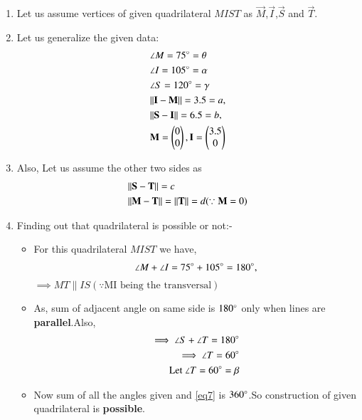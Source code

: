 \documentclass[journal,12pt,twocolumn]{IEEEtran}
\begin{document}
\begin{enumerate}
\item Let us assume vertices of given quadrilateral $MIST$ as $\vec{M}$,$\vec{I}$,$\vec{S}$ and $\vec{T}$.

\item Let us generalize the given data:
    \begin{align}
    &\angle M= 75\degree=\theta \label{eq1}
    \\
    &\angle I= 105\degree=\alpha
    \\
    &\angle S= 120\degree=\gamma \label{eq2}
    \\
    &\Vert\mathbf{I}-\mathbf{M}\rVert =3.5=a, \label{eq3}
    \\
    &\Vert\mathbf{S}-\mathbf{I}\rVert =6.5=b,\label{eq4}
    \\
    &\mathbf{M}=\begin{pmatrix}0\\0\end{pmatrix}, \mathbf{I}=\begin{pmatrix}3.5\\0\end{pmatrix}
    \end{align}
\item Also, Let us assume the other two sides as
\begin{align}
 &\Vert\mathbf{S}-\mathbf{T}\rVert=c \label{eq5}
 \\
  &\Vert\mathbf{M}-\mathbf{T}\rVert=\Vert\mathbf{T}\rVert =d \label{eq6} (\because \mathbf{M}=0)
\end{align}  
\item Finding out that quadrilateral is possible or not:-
\begin{itemize}
\item For this quadrilateral $MIST$ we have,
\begin{align}
\angle M +\angle I = 75\degree + 105\degree =180\degree,
\end{align}
$ \implies MT \parallel IS (\because \text {MI being the transversal})$
\\
\item As, sum of adjacent angle on same side is $180\degree$ only when lines are \textbf{parallel}.Also,
\begin{align}
\implies \angle S + \angle T = 180\degree 
\\
\implies \angle T = 60\degree 
\\
\text{Let }\angle T = 60\degree =\beta \label{eq7}
\end{align}
\item Now sum of all the angles given and \eqref{eq7} is $360\degree$.So construction of given quadrilateral is \textbf{possible}.
\end{itemize}
\begin{lemma}

\end{lemma}
\end{enumerate}
\end{document}
